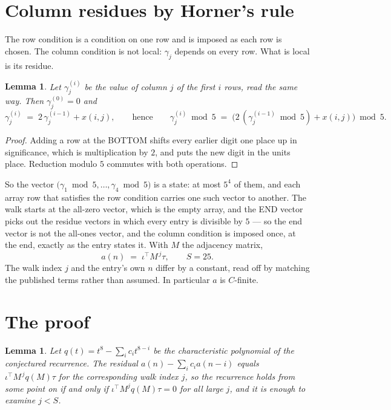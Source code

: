 \documentclass[11pt,a4paper]{article}
\theoremstyle{plain}
\newtheorem{lemma}[theorem]{Lemma}
\theoremstyle{definition}
\begin{document}
\section{Column residues by Horner's rule}

The row condition is a condition on one row and is imposed as each row is chosen. The column
condition is not local: $\gamma_j$ depends on every row. What is local is its residue.

\begin{lemma}\label{lem:horner}
Let $\gamma_j^{(i)}$ be the value of column $j$ of the first $i$ rows, read the same way.
Then $\gamma_j^{(0)}=0$ and
\[
\gamma_j^{(i)}\;=\;2\,\gamma_j^{(i-1)}+x(i,j),
\qquad\text{hence}\qquad
\gamma_j^{(i)}\bmod 5\;=\;
\bigl(2\,(\gamma_j^{(i-1)}\bmod 5)+x(i,j)\bigr)\bmod 5 .
\]
\end{lemma}

\begin{proof}
Adding a row at the BOTTOM shifts every earlier digit one place up in significance, which is
multiplication by $2$, and puts the new digit in the units place. Reduction modulo
$5$ commutes with both operations.
\end{proof}

So the vector $\bigl(\gamma_1\bmod 5,\dots,\gamma_{4}\bmod
5\bigr)$ is a state: at most $5^{4}$ of them, and each array row
that satisfies the row condition carries one such vector to another. The walk starts at the
all-zero vector, which is the empty array, and the END vector picks out the residue vectors in
which every entry is divisible by $5$ --- so the end vector is not the all-ones
vector, and the column condition is imposed once, at the end, exactly as the entry states it.
With $M$ the adjacency matrix,
\[
a(n)\;=\;\iota^{\!\top}M^{\,j}\tau ,\qquad S=25.
\]
The walk index $j$ and the entry's own $n$ differ by a constant, read off by matching the
published terms rather than assumed. In particular $a$ is $C$-finite.

\section{The proof}

\begin{lemma}\label{lem:crit}
Let $q(t)=t^{8}-\sum_i c_it^{8-i}$ be the characteristic polynomial of the
conjectured recurrence. The residual $a(n)-\sum_ic_ia(n-i)$ equals
$\iota^{\!\top}M^{\,j}q(M)\tau$ for the corresponding walk index $j$, so the recurrence
holds from some point on if and only if $\iota^{\!\top}M^{j}q(M)\tau=0$ for all large $j$,
and it is enough to examine $j<S$.
\end{lemma}
\end{document}
